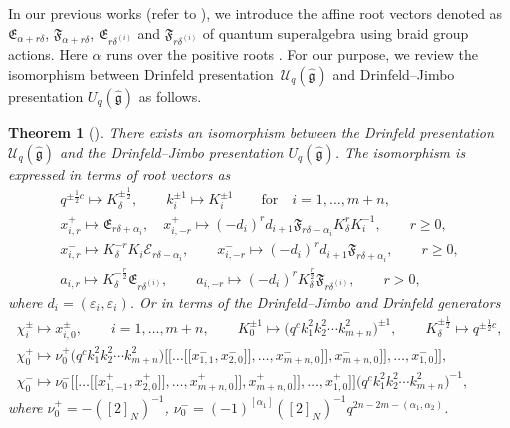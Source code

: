 \documentclass[10pt,a4paper]{amsart}
\numberwithin{equation}{section}
\newtheorem{Theorem}{Theorem}[section]
\begin{document}
In our previous works (refer to \cite{XWLHZ}), we introduce the affine root vectors denoted as $\mathfrak{E}_{\alpha+r\delta}$, $\mathfrak{F}_{\alpha+r\delta}$, $\mathfrak{E}_{r\delta^{(i)}}$ and $\mathfrak{F}_{r\delta^{(i)}}$ of quantum superalgebra using braid group actions. Here $\alpha$ runs over the positive roots \smash{$\widehat{\Delta}_+$}. For our purpose, we review the
isomorphism between Drinfeld presentation~$\mathcal{U}_q(\mathfrak{\hat{g}})$ and Drinfeld--Jimbo presentation $U_q(\mathfrak{\hat{g}})$ as follows.
\begin{Theorem}[{\cite[Theorem 3.6]{XWLHZ}}]\label{DR-DRJ}
There exists an isomorphism between the Drinfeld presentation~$\mathcal{U}_q(\mathfrak{\hat{g}})$ and the Drinfeld--Jimbo presentation $U_q(\mathfrak{\hat{g}})$. The isomorphism is expressed in terms of root vectors as
\begin{gather*}
q^{\pm\frac{1}{2}c} \mapsto K_{\delta}^{\pm\frac{1}{2}},\qquad k_i^{\pm 1} \mapsto K_i^{\pm 1}\qquad \text{for}\quad i=1,\ldots,m+n, \\
x_{i,r}^+ \mapsto \mathfrak{E}_{r\delta+\alpha_i},\quad x_{i,-r}^+ \mapsto (-d_i)^rd_{i+1}\mathfrak{F}_{r\delta-\alpha_i}K_{\delta}^{r}K_i^{-1}, \qquad r\geq0,\\
x_{i,r}^- \mapsto K_{\delta}^{-r}K_i\mathcal{E}_{r\delta-\alpha_i},\qquad x_{i,-r}^- \mapsto (-d_i)^rd_{i+1}\mathfrak{F}_{r\delta+\alpha_i}, \qquad r\geq0,\\
a_{i,r} \mapsto K_{\delta}^{-\frac{r}{2}}\mathfrak{E}_{r\delta^{(i)}},\qquad a_{i,-r} \mapsto (-d_i)^rK_{\delta}^{\frac{r}{2}}\mathfrak{F}_{r\delta^{(i)}},\qquad r>0,
\end{gather*}
where $d_i=(\varepsilon_i,\varepsilon_i)$. Or in terms of the Drinfeld--Jimbo and Drinfeld generators
\begin{gather*}
\chi_i^{\pm}\mapsto x_{i,0}^{\pm},\qquad i=1,\ldots,m+n, \qquad
K_0^{\pm 1}\mapsto \bigl(q^ck_1^2k_2^2\cdots k_{m+n}^2\bigr)^{\pm 1},\qquad K_{\delta}^{\pm\frac{1}{2}}\mapsto q^{\pm\frac{1}{2}c}, \\
\chi_0^+\mapsto \nu_0^+ \bigl(q^ck_1^2k_2^2\cdots k_{m+n}^2\bigr) \bigl[\!\!\bigl[\dots\bigl[\!\!\bigl[x_{1,1}^-,x_{2,0}^-\bigr]\!\!\bigr],\ldots,x_{m+n,0}^-\bigr]\!\!\bigr],x_{m+n,0}^-\bigr]\!\!\bigr],\ldots,x_{1,0}^-\bigr]\!\!\bigr], \\
\chi_0^-\mapsto \nu_0^- \bigl[\!\!\bigl[\dots\bigl[\!\!\bigl[x_{1,-1}^+,x_{2,0}^+\bigr]\!\!\bigr],\ldots,x_{m+n,0}^+\bigr]\!\!\bigr],x_{m+n,0}^+\bigr]\!\!\bigr],\ldots,x_{1,0}^+\bigr]\!\!\bigr] \bigl(q^ck_1^2k_2^2\cdots k_{m+n}^2\bigr)^{-1},
\end{gather*}
where $\nu_0^+=-([2]_N)^{-1}$, $\nu_0^-=(-1)^{[\alpha_1]}([2]_N)^{-1}q^{2n-2m-(\alpha_1,\alpha_2)}$.
\end{Theorem}
\end{document}
